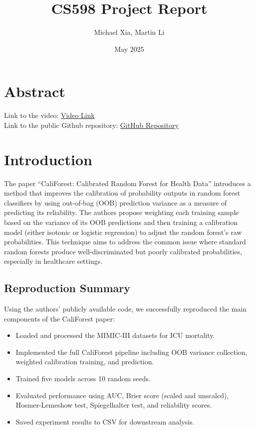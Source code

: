 \documentclass{article}
\title{CS598 Project Report}
\author{Michael Xia, Martin Li}
\date{May 2025}
\begin{document}
\maketitle

\section{Abstract}
Link to the video: \href{<insert-video-link-here>}{Video Link} \\
Link to the public Github repository: \href{https://github.com/martin-lzhijian/DLH-Califorest}{GitHub Repository}

\section{Introduction}
The paper “CaliForest: Calibrated Random Forest for Health Data” introduces a method that improves the calibration of probability outputs in random forest classifiers by using out-of-bag (OOB) prediction variance as a measure of predicting its reliability. The authors propose weighting each training sample based on the variance of its OOB predictions and then training a calibration model (either isotonic or logistic regression) to adjust the random forest's raw probabilities. This technique aims to address the common issue where standard random forests produce well-discriminated but poorly calibrated probabilities, especially in healthcare settings.

\subsection*{Reproduction Summary}
Using the authors’ publicly available code, we successfully reproduced the main components of the CaliForest paper:
\begin{itemize}
  \item Loaded and processed the MIMIC-III datasets for ICU mortality.
  \item Implemented the full CaliForest pipeline including OOB variance collection, weighted calibration training, and prediction.
  \item Trained five models across 10 random seeds.
  \item Evaluated performance using AUC, Brier score (scaled and unscaled), Hosmer-Lemeshow test, Spiegelhalter test, and reliability scores.
  \item Saved experiment results to CSV for downstream analysis.
\end{itemize}
\end{document}
